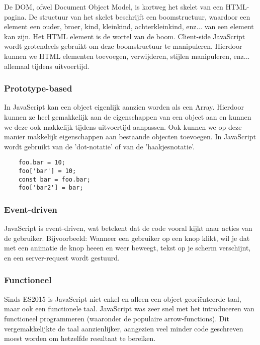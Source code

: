 De DOM, ofwel Document Object Model, is kortweg het skelet van een HTML-pagina. De structuur van het skelet beschrijft een boomstructuur, waardoor een element een ouder, broer, kind, kleinkind, achterkleinkind, enz... van een element kan zijn. Het HTML element is de wortel van de boom. Client-side JavaScript wordt grotendeels gebruikt om deze boomstructuur te manipuleren. Hierdoor kunnen we HTML elementen toevoegen, verwijderen, stijlen manipuleren, enz... allemaal tijdens uitvoertijd. \textcite{Kantor2017}

\subsubsection{Prototype-based}
\label{sec:prototypeBased}

In JavaScript kan een object eigenlijk aanzien worden als een Array. Hierdoor kunnen ze heel gemakkelijk aan de eigenschappen van een object aan en kunnen we deze ook makkelijk tijdens uitvoertijd aanpassen. Ook kunnen we op deze manier makkelijk eigenschappen aan bestaande objecten toevoegen. In JavaScript wordt gebruikt van de 'dot-notatie' of van de 'haakjesnotatie'. 

	\begin{verbatim}
	foo.bar = 10;
	foo['bar'] = 10;
	const bar = foo.bar;
	foo['bar2'] = bar;
	\end{verbatim}

\subsubsection{Event-driven}
\label{sec:eventDriven}

JavaScript is event-driven, wat betekent dat de code vooral kijkt naar acties van de gebruiker. Bijvoorbeeld: Wanneer een gebruiker op een knop klikt, wil je dat met een animatie de knop heeen en weer beweegt, tekst op je scherm verschijnt, en een server-request wordt gestuurd. 

\subsubsection{Functioneel}
\label{sec:functional}

Sinds ES2015 is JavaScript niet enkel en alleen een object-georiënteerde taal, maar ook een functionele taal. JavaScript was zeer snel met het introduceren van functioneel programmeren (waaronder de populaire arrow-functions). Dit vergemakkelijkte de taal aanzienlijker, aangezien veel minder code geschreven moest worden om hetzelfde resultaat te bereiken.

